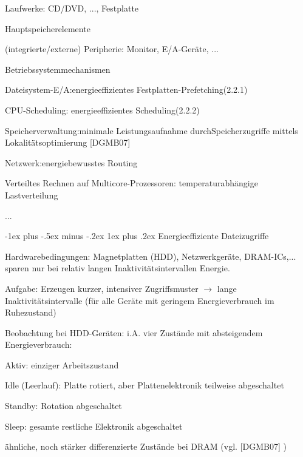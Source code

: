 \documentclass[a4paper]{article}
\makeatletter
\renewcommand{\subsubsection}{\@startsection{subsubsection}{3}{0mm}%
 {-1ex plus -.5ex minus -.2ex}%
 {1ex plus .2ex}%
 {\normalfont\small\bfseries}}
\makeatother
\begin{document}
\begin{multicols}{3}
    \begin{enumerate*}
        \item
        Laufwerke: CD/DVD, ..., Festplatte
        \item
        Hauptspeicherelemente
        \item
        (integrierte/externe) Peripherie: Monitor, E/A-Geräte, ...
    \end{enumerate*}

    Betriebssystemmechanismen

    \begin{enumerate*}
        \item
        Dateisystem-E/A:energieeffizientes Festplatten-Prefetching(2.2.1)
        \item
        CPU-Scheduling: energieeffizientes Scheduling(2.2.2)
        \item
        Speicherverwaltung:minimale Leistungsaufnahme durchSpeicherzugriffe
        mittels Lokalitätsoptimierung {[}DGMB07{]}
        \item
        Netzwerk:energiebewusstes Routing
        \item
        Verteiltes Rechnen auf Multicore-Prozessoren: temperaturabhängige
        Lastverteilung
        \item
        ...
    \end{enumerate*}


    \subsubsection{Energieeffiziente
        Dateizugriffe}

    Hardwarebedingungen: Magnetplatten (HDD), Netzwerkgeräte, DRAM-ICs,...
    sparen nur bei relativ langen Inaktivitätsintervallen Energie.

    \begin{itemize*}
        \item
        Aufgabe: Erzeugen kurzer, intensiver Zugriffsmuster
        $\rightarrow$  lange Inaktivitätsintervalle (für alle
        Geräte mit geringem Energieverbrauch im Ruhezustand)
        \item
        Beobachtung bei HDD-Geräten: i.A. vier Zustände mit absteigendem
        Energieverbrauch:
        \begin{enumerate*}

            \item Aktiv: einziger Arbeitszustand
            \item Idle (Leerlauf): Platte rotiert, aber Plattenelektronik teilweise abgeschaltet
            \item Standby: Rotation abgeschaltet
            \item Sleep: gesamte restliche Elektronik abgeschaltet
        \end{enumerate*}
        \item
        ähnliche, noch stärker differenzierte Zustände bei DRAM (vgl.
        {[}DGMB07{]} )
    \end{itemize*}


\end{multicols}
\end{document}
